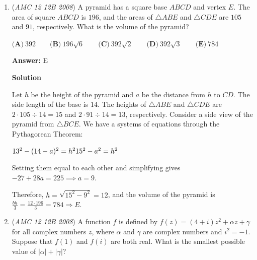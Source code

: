 \begin{enumerate}
 This means that $\angle C=90^\circ$ and $AC$ is perpendicular to $BC$. Let C be the point $(n, n^2)$.  So the slope of $BC$ is the negative reciprocal of the slope of $AC$, yielding $m+n=\frac{1}{m-n}$ $\Rightarrow$ $m^2-n^2=1$. 

 Because $m^2-n^2$ is the length of the altitude of triangle $ABC$ from $AB$, and $2m$ is the length of $AB$, the area of $\triangle ABC=m(m^2-n^2)=2008$. Since $m^2-n^2=1$, $m=2008$. Substituting, $2008^2-n^2=1$ $\Rightarrow$ $n^2=2008^2-1=(2000+8)^2-1=4000000+32000+64-1=4032063$, whose digits sum to $18 \Rightarrow \textbf{(C)}$.

 


	\item (\textit{AMC 12 12B 2008}) A pyramid has a square base $ABCD$ and vertex $E$.  The area of square $ABCD$ is $196$, and the areas of $\triangle ABE$ and $\triangle CDE$ are $105$ and $91$, respectively.  What is the volume of the pyramid?


 $\textbf{(A)}\ 392 \qquad \textbf{(B)}\ 196\sqrt {6} \qquad \textbf{(C)}\ 392\sqrt {2} \qquad \textbf{(D)}\ 392\sqrt {3} \qquad \textbf{(E)}\ 784$

 \textbf{Answer: }E



\textbf{Solution}

Let $h$ be the height of the pyramid and $a$ be the distance from $h$ to $CD$. The side length of the base is $14$. The heights of $\triangle ABE$ and $\triangle CDE$ are $2\cdot105\div14=15$ and $2\cdot91\div14=13$, respectively. Consider a side view of the pyramid from $\triangle BCE$.  We have a systems of equations through the Pythagorean Theorem:

 $13^2-(14-a)^2=h^2 \\ 15^2-a^2=h^2$

 Setting them equal to each other and simplifying gives$-27+28a=225 \implies a=9$.

 Therefore, $h=\sqrt{15^2-9^2}=12$, and the volume of the pyramid is $\frac{bh}{3}=\frac{12\cdot 196}{3}=\boxed{784 \Rightarrow E}$.

 


	\item (\textit{AMC 12 12B 2008}) A function $f$ is defined by $f(z) = (4 + i) z^2 + \alpha z + \gamma$ for all complex numbers $z$, where $\alpha$ and $\gamma$ are complex numbers and $i^2 = - 1$. Suppose that $f(1)$ and $f(i)$ are both real. What is the smallest possible value of $| \alpha | + |\gamma |$?



\end{enumerate}
